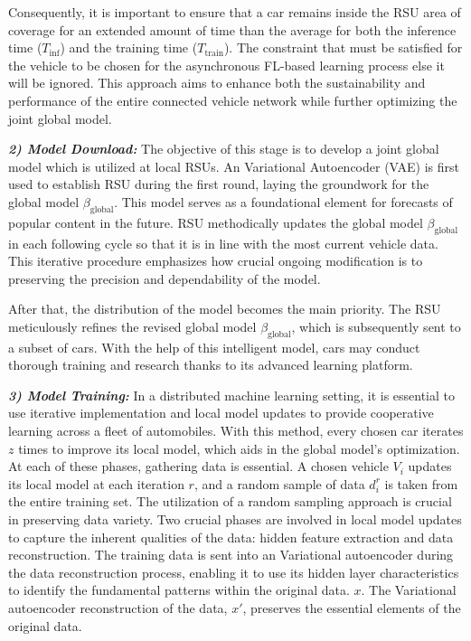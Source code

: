 \documentclass[journal]{IEEEtran}
\begin{document}
Consequently, it is important to ensure that a car remains inside the RSU area of coverage for an extended amount of time than the average for both the inference time ($T_{\text{inf}}$) and the training time ($T_{\text{train}}$). The constraint that must be satisfied for the vehicle to be chosen for the asynchronous FL-based learning process else it will be ignored. This approach aims to enhance both the sustainability and performance of the entire connected vehicle network while further optimizing the joint global model.




\textbf{\textit{2) Model Download:}} The objective of this stage is to develop a joint global model which is utilized at local RSUs. An Variational Autoencoder (VAE) is first used to establish RSU during the first round, laying the groundwork for the global model $\beta_{\text{global}}$. This model serves as a foundational element for forecasts of popular content in the future. RSU methodically updates the global model $\beta_{\text{global}}$ in each following cycle so that it is in line with the most current vehicle data. This iterative procedure emphasizes how crucial ongoing modification is to preserving the precision and dependability of the model.

After that, the distribution of the model becomes the main priority. The RSU meticulously refines the revised global model $\beta_{\text{global}}$, which is subsequently sent to a subset of cars. With the help of this intelligent model, cars may conduct thorough training and research thanks to its advanced learning platform.


\textbf{\textit{3) Model Training:}} In a distributed machine learning setting, it is essential to use iterative implementation and local model updates to provide cooperative learning across a fleet of automobiles. With this method, every chosen car iterates $z$ times to improve its local model, which aids in the global model's optimization. At each of these phases, gathering data is essential.
A chosen vehicle $V_i$ updates its local model at each iteration $r$, and a random sample of data $d^r_i$ is taken from the entire training set. The utilization of a random sampling approach is crucial in preserving data variety.
Two crucial phases are involved in local model updates to capture the inherent qualities of the data: hidden feature extraction and data reconstruction. The training data is sent into an Variational autoencoder during the data reconstruction process, enabling it to use its hidden layer characteristics to identify the fundamental patterns within the original data. $x$. The Variational autoencoder reconstruction of the data, $x'$, preserves the essential elements of the original data.
\end{document}
